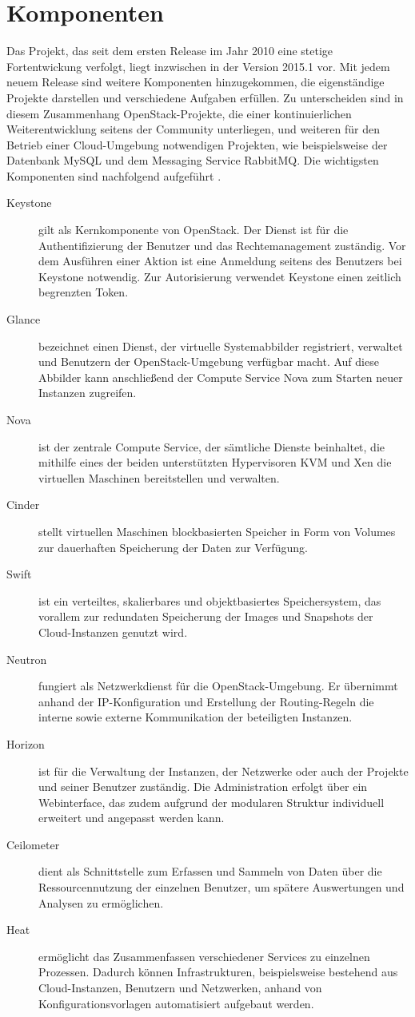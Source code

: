 \section{Komponenten}Das Projekt, das seit dem ersten Release im Jahr 2010 eine stetige Fortentwickung verfolgt, liegt inzwischen in der Version 2015.1 vor. Mit jedem neuem Release sind weitere Komponenten hinzugekommen, die eigenständige Projekte darstellen und verschiedene Aufgaben erfüllen. Zu unterscheiden sind in diesem Zusammenhang OpenStack-Projekte, die einer kontinuierlichen Weiterentwicklung seitens der Community unterliegen, und weiteren für den Betrieb einer Cloud-Umgebung notwendigen Projekten, wie beispielsweise der Datenbank MySQL und dem Messaging Service RabbitMQ. Die wichtigsten Komponenten sind nachfolgend aufgeführt \cite[vgl.][S. 20-28]{Beitter}.
\begin{description}
\item[Keystone] gilt als Kernkomponente von OpenStack. Der Dienst ist für die Authentifizierung der Benutzer und das Rechtemanagement zuständig. Vor dem Ausführen einer Aktion ist eine Anmeldung seitens des Benutzers bei Keystone notwendig. Zur Autorisierung verwendet Keystone einen zeitlich begrenzten Token.
\item[Glance] bezeichnet einen Dienst, der virtuelle Systemabbilder registriert, verwaltet und Benutzern der OpenStack-Umgebung verfügbar macht. Auf diese Abbilder kann anschließend der Compute Service Nova zum Starten neuer Instanzen zugreifen. 
\item[Nova] ist der zentrale Compute Service, der sämtliche Dienste beinhaltet, die mithilfe eines der beiden unterstützten Hypervisoren KVM und Xen die virtuellen Maschinen bereitstellen und verwalten.
\item[Cinder] stellt virtuellen Maschinen blockbasierten Speicher in Form von Volumes zur dauerhaften Speicherung der Daten zur Verfügung. 
\item[Swift] ist ein verteiltes, skalierbares und objektbasiertes Speichersystem, das vorallem zur redundaten Speicherung der Images und Snapshots der Cloud-Instanzen genutzt wird.
\item[Neutron] fungiert als Netzwerkdienst für die OpenStack-Umgebung. Er übernimmt anhand der IP-Konfiguration und Erstellung der Routing-Regeln die interne sowie externe Kommunikation der beteiligten Instanzen.
\item[Horizon] ist für die Verwaltung der Instanzen, der Netzwerke oder auch der Projekte und seiner Benutzer zuständig. Die Administration erfolgt über ein Webinterface, das zudem aufgrund der modularen Struktur individuell erweitert und angepasst werden kann. 
\item[Ceilometer] dient als Schnittstelle zum Erfassen und Sammeln von Daten über die Ressourcennutzung der einzelnen Benutzer, um spätere Auswertungen und Analysen zu ermöglichen.
\item[Heat] ermöglicht das Zusammenfassen verschiedener Services zu einzelnen Prozessen. Dadurch können Infrastrukturen, beispielsweise bestehend aus Cloud-Instanzen, Benutzern und Netzwerken, anhand von Konfigurationsvorlagen automatisiert aufgebaut werden.
\end{description}
